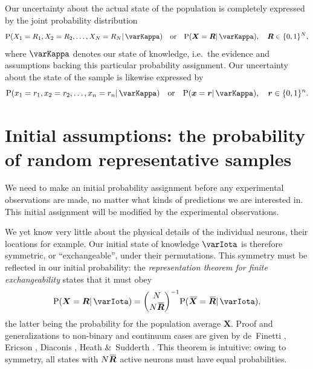 \documentclass{article}
\theoremstyle{remark}
\theoremstyle{innote}
\newcommand*{\citep}{\parencites}
\renewcommand*{\cite}{\citep}
\newcommand*{\amp}{\&}
\renewcommand*{\|}{\mathpunct{|}}%
\DeclarePairedDelimiter\set{\{}{\}}
\newcommand*{\p}{\mathrm{P}}%
\newcommand*{\ie}{{i.e.}}
\theoremstyle{simple}
\newcommand*{\widebar}[1]{{\mkern1.5mu\skew{2}\overline{\mkern-1.5mu#1\mkern-1.5mu}\mkern 1.5mu}}
\newcommand*{\av}{\widebar} %
\newcommand*{\yxx}{x}%
\newcommand*{\yx}{\bm{\yxx}}%
\newcommand*{\yX}{\bm{X}}%
\newcommand*{\yXf}{\av{\yX}}%
\newcommand*{\yr}{\bm{r}}%
\newcommand*{\yR}{\bm{R}}%
\newcommand*{\yRf}{\av{\yR}}%
\newcommand*{\yH}{\varIota}
\newcommand*{\yHc}{\varKappa}
\begin{document}
Our uncertainty about the actual state of the population is completely
expressed by the joint probability distribution
\begin{equation}
  \label{eq:joint_plaus}
  \p(X_1=R_1, X_2=R_2, \dotsc, X_N=R_N \| \yHc) \quad\text{or}\quad
\p(\yX =\yR \| \yHc), \quad \yR \in \set{0,1}^N,
\end{equation}
where $\yHc$ denotes our state of knowledge, \ie\ the evidence and
assumptions backing this particular probability assignment. Our uncertainty
about the state of the sample is likewise expressed by
\begin{equation}
  \label{eq:sample_plaus}
  \p(x_1=r_1, x_2=r_2, \dotsc, x_n=r_n \| \yHc) \quad\text{or}\quad
\p(\yx =\yr \| \yHc), \quad \yr \in \set{0,1}^n.
\end{equation}

\section{Initial assumptions: the probability of random representative samples}
\label{sec:prob_samples}

We need to make an initial probability assignment before any experimental
observations are made, no matter what kinds of predictions we are
interested in. This initial assignment will be modified by the experimental
observations.

We yet know very little about the physical details of the individual
neurons, their locations for example. Our initial state of knowledge $\yH$
is therefore symmetric, or \enquote{exchangeable}, under their
permutations. This symmetry must be reflected in our initial probability:
the \emph{representation theorem for finite exchangeability} states that it
must obey
\begin{equation}
  \label{eq:joint_plaus_N_homog}
  \p(\yX = \yR \| \yH) = \binom{N}{N\yRf}^{-1} \p(\yXf=\yRf \| \yH),
\end{equation}
the latter being the probability for the population average $\yX$. Proof
and generalizations to non-binary and continuum cases are given by
de~Finetti \cite{definetti1959b}, Ericson \cite{ericson1976}, Diaconis
\cite{diaconis1977}, Heath \amp\ Sudderth \cite{heathetal1976}. This
theorem is intuitive: owing to symmetry, all states with $N\yRf$ active
neurons must have equal probabilities.
\end{document}
